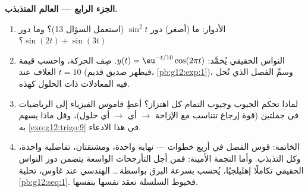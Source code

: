 \begin{problem}
\medskip
\noindent\textbf{الجزء الرابع --- العالم المتذبذب.}
\begin{enumerate}[resume]
  \item الأدوار: ما (أصغر) دور 
        $\sin^2 t$ (استعمل السؤال 13)؟ وما دور
        $\sin(2t) + \sin(3t)$؟
  \item النواس الحقيقي يُخمَّد:
        $y(t) = \eu^{-t/10}\cos(2\pi t)$. صِف الحركة،
        واحسب قيمة الغلاف عند $t = 10$ (فيظهر صديق قديم،
        \cref{pb:g12:exp:1})، وسمِّ الفصل الذي
        تُحل فيه المعادلات ذات الحلول كهذه.
  \item لماذا تحكم الجيوب وجيوب التمام كل اهتزاز؟ أعطِ
        قاموس الفيزياء إلى الرياضيات في جملتين
        (قوة إرجاع تتناسب مع الإزاحة
        $\rightarrow$ أي  $\rightarrow$ أي
        حلول)، وقل ماذا يسهم به \cref{exo:g12:trigo:9}
        في هذا الادعاء.
  \item الخاتمة: قوس الفصل في أربع خطوات --- نهاية
         واحدة، ومشتقتان،  تفاضلية
        واحدة، وكل التذبذب. وأما النجمة الأمينة:
        فمن أجل التأرجحات الواسعة يتضمن دور النواس الحقيقي
        تكاملًا إهليلجيًا، يُحسب بسرعة البرق بواسطة\,\dots
         الهندسي عند غاوس، تحلية
        \cref{pb:g12:seq:1}. فخيوط السلسلة تعقد نفسها بنفسها.
\end{enumerate}
\end{problem}
